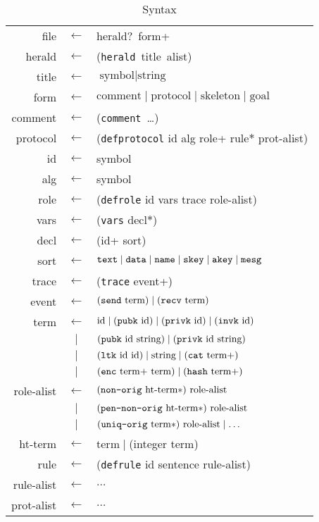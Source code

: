 \begin{table}
\newcommand{\sym}[1]{\textup{\texttt{#1}}}
\begin{center}\scshape
\begin{tabular}{rcl}
file&$\leftarrow$&herald?~form+
\\herald&$\leftarrow$&
(\sym{herald}~title~alist)
\\title&$\leftarrow$&$\mbox{symbol}\mid\mbox{string}$
\\form&$\leftarrow$&
$\mbox{comment}\mid\mbox{protocol}\mid\mbox{skeleton}\mid\mbox{goal}$
\\ comment&$\leftarrow$&
(\sym{comment}~\ldots)
\\ protocol&$\leftarrow$&
(\sym{defprotocol} id alg role+ rule$\ast$ prot-alist)
\\ id&$\leftarrow$&symbol
\\ alg&$\leftarrow$&symbol
\\ role&$\leftarrow$&
(\sym{defrole} id vars trace role-alist)
\\ vars&$\leftarrow$&
(\sym{vars} decl$\ast$)
\\ decl&$\leftarrow$&
(id+ sort)
\\ sort&$\leftarrow$&
$\sym{text} \mid \sym{data} \mid \sym{name} \mid \sym{skey}
\mid \sym{akey}\mid\sym{mesg}$
\\ trace&$\leftarrow$&(\sym{trace} event+)
\\ event&$\leftarrow$&
$(\sym{send}\mbox{ term})\mid(\sym{recv}\mbox{ term})$
\\ term&$\leftarrow$&
$\mbox{id}\mid(\sym{pubk}\mbox{ id})
\mid(\sym{privk}\mbox{ id})
\mid(\sym{invk}\mbox{ id})$
\\ &$\mid$&$(\sym{pubk}\mbox{ id}\mbox{ string})
\mid(\sym{privk}\mbox{ id}\mbox{ string})$
\\ &$\mid$&$(\sym{ltk}\mbox{ id id})\mid\mbox{string}\mid(\sym{cat}\mbox{ term+})$
\\ &$\mid$&$(\sym{enc}\mbox{ term+ term})\mid(\sym{hash}\mbox{ term+})$
\\ role-alist&$\leftarrow$&$
(\sym{non-orig}\mbox{ ht-term}\ast)\mbox{ role-alist}$
\\ &$\mid$&$(\sym{pen-non-orig}\mbox{ ht-term}\ast)\mbox{ role-alist}$
\\ &$\mid$&$(\sym{uniq-orig}\mbox{ term}\ast)\mbox{ role-alist}\mid\ldots$
\\ ht-term&$\leftarrow$&term${}\mid{}$(integer term)
\\ rule&$\leftarrow$&
(\sym{defrule} id sentence rule-alist)
\\ rule-alist&$\leftarrow$&$\ldots$
\\ prot-alist&$\leftarrow$&$\ldots$
\end{tabular}
\end{center}
\caption{{\cpsa} Syntax}\label{tab:syntax}
\end{table}

